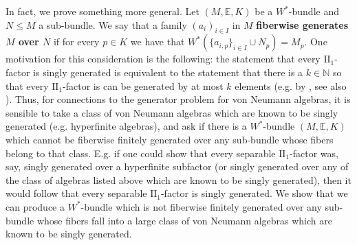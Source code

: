 \documentclass[10pt]{amsart}
\theoremstyle{definition}
\numberwithin{equation}{section}
\newcommand{\bE}{{\mathbb E}}
\newcommand{\bN}{{\mathbb N}}
\begin{document}
In fact, we prove something more general. Let $(M,\bE,K)$ be a $W^{*}$-bundle and $N\leq M$ a sub-bundle. We say that a family $(a_{i})_{i\in I}$ in $M$ \textbf{fiberwise generates $M$ over $N$} if for every $p\in K$ we have that $W^{*}(\{a_{i,p}\}_{i\in I}\cup N_{p})=M_{p}$. 
One motivation for this consideration is the following: the statement that every $\textrm{II}_{1}$-factor is singly generated is equivalent to the statement that there is a $k\in \bN$ so that every $\textrm{II}_{1}$-factor is can be generated by at most $k$ elements (e.g. by \cite{PearcySG}, see also \cite[Theorem 6.3]{CardinalInvariantsSherman}). Thus, for connections to the generator problem for von Neumann algebras, it is sensible to take a class of von Neumann algebras which are known to be singly generated (e.g. hyperfinite algebras), and ask if there is a $W^{*}$-bundle $(M,\bE,K)$ which cannot be fiberwise finitely generated over any sub-bundle whose fibers belong to that class. E.g. if one could show that every separable $\textrm{II}_{1}$-factor was, say, singly generated over a hyperfinite subfactor (or singly generated over any of the class of algebras listed above which are known to be singly generated), then it would follow that every separable $\textrm{II}_{1}$-factor is singly generated. We show that we can produce a $W^{*}$-bundle which is not fiberwise finitely generated over any sub-bundle whose fibers fall into a large class of von Neumann algebras which are known to be singly generated. 
\end{document}
